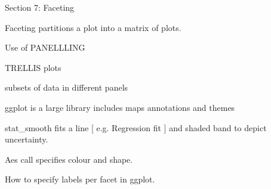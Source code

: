 Section 7: Faceting


 Faceting partitions a plot into a matrix of plots.

Use of PANELLLING

TRELLIS plots

subsets of data in different panels


ggplot is a large library includes maps annotations and themes


stat_smooth fits a line [ e.g. Regression fit ] and shaded band to depict uncertainty.


Aes call specifies colour and shape.


How to specify labels per facet in ggplot. 

